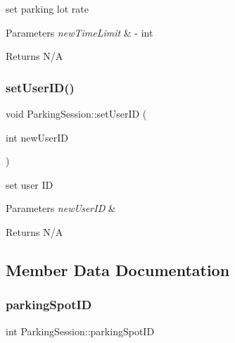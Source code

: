 set parking lot rate 


\begin{DoxyParams}{Parameters}
{\em new\+Time\+Limit} & -\/ int \\
\hline
\end{DoxyParams}
\begin{DoxyReturn}{Returns}
N/A 
\end{DoxyReturn}
\mbox{\label{class_parking_session_ac68d6b980db1def77be515abde9f3e27}} 
\subsubsection{\texorpdfstring{set\+User\+I\+D()}{setUserID()}}
{\footnotesize\ttfamily void Parking\+Session\+::set\+User\+ID (\begin{DoxyParamCaption}\item[{int}]{new\+User\+ID }\end{DoxyParamCaption})}



set user ID 


\begin{DoxyParams}{Parameters}
{\em new\+User\+ID} & \\
\hline
\end{DoxyParams}
\begin{DoxyReturn}{Returns}
N/A 
\end{DoxyReturn}


\subsection{Member Data Documentation}
\mbox{\label{class_parking_session_a63055bbfd23ccc76ff15e966dc0d8fd9}} 
\subsubsection{\texorpdfstring{parking\+Spot\+ID}{parkingSpotID}}
{\footnotesize\ttfamily int Parking\+Session\+::parking\+Spot\+ID\hspace{0.3cm}{\ttfamily [private]}}


